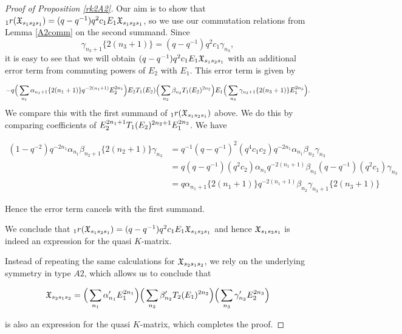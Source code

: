 \documentclass[a4 paper, 10pt]{article}
\begin{document}
\begin{proof}[Proof of Proposition \ref{rk2A2}]
	Our aim is to show that ${}_{1}r(\mathfrak{X}_{s_1s_2s_1} ) = (q-q^{-1})q^2c_1E_1\mathfrak{X}_{s_1s_2s_1}$, so we use our commutation 	relations from Lemma \ref{A2comm} on the second summand. Since
		\begin{equation}
			\gamma_{n_3+1} \{2(n_3 + 1)\} = (q-q^{-1})q^2c_1 \gamma_{n_3},
		\end{equation}
	it is easy to see that we will obtain $(q - q^{-1})q^2c_1E_1\mathfrak{X}_{s_1s_2s_1}$ with an additional error term from commuting powers of $E_2$ with $E_1$. This error term is given by
	
		\begin{equation*}
			-q \Big( \sum_{n_1} \alpha_{n_1 + 1} \{ 2(n_1 + 1) \} q^{-2(n_1 + 1)} E_2^{2n_1} \Big) E_2T_{1}(E_2) \Big(\sum_{n_2} \beta_{n_2}  T_{1}(E_2)^{2n_2} \Big) E_1 \Big( \sum_{n_3} \gamma_{n_3+1} \{ 2(n_3+1) \} E_1^{2n_3} \Big).
		\end{equation*}
	We compare this with the first summand of ${}_{1}r(\mathfrak{X}_{s_1s_2s_1})$ above. We do this by comparing coefficients of $E_2^{2n_1 + 1}T_{1}(E_2)^{2n_2+1}E_1^{2n_3}$. We have
	
		\begin{align*}
			(1 - q^{-2})q^{-2n_1}\alpha_{n_1}\beta_{n_2+1}\{2(n_2+1)\}\gamma_{n_3} &= q^{-1}(q-q^{-1})^2(q^4c_1c_2)q^{-2n_1}\alpha_{n_1}\beta_{n_2}\gamma_{n_3} \\
				&= q (q-q^{-1})(q^2c_2)\alpha_{n_1}q^{-2(n_1+1)}\beta_{n_2}(q-q^{-1})(q^2c_1)\gamma_{n_3} \\
				&= q \alpha_{n_1 + 1} \{ 2( n_1 + 1 ) \} q^{ -2 (n_1 + 1) } \beta_{n_2} \gamma_{ n_3+1 } \{ 2( n_3 + 1 ) \}
		\end{align*}
		
Hence the error term cancels with the first summand. 

We conclude that ${}_{1}r(\mathfrak{X}_{s_1s_2s_1}) = (q-q^{-1})q^2c_1E_1\mathfrak{X}_{s_1s_2s_1}$ and hence $\mathfrak{X}_{s_1s_2s_1}$ is indeed an expression for the quasi $K$-matrix. 

Instead of repeating the same calculations for $\mathfrak{X}_{s_2s_1s_2}$, we rely on the underlying symmetry in type $A2$, which allows us to conclude that 

	\begin{equation}
		\mathfrak{X}_{s_2s_1s_2} = \Big(\sum_{n_1} \alpha_{n_1}^{\prime} E_1^{2n_1} \Big) \Big(\sum_{n_2} \beta_{n_2}^{\prime} T_{2}(E_1)^{2n_2} \Big) \Big(\sum_{n_3} \gamma_{n_3}^{\prime} E_2^{2n_3} \Big)
	\end{equation}

is also an expression for the quasi $K$-matrix, which completes the proof.
\end{proof}
\end{document}
